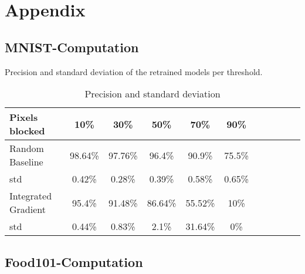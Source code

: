 \documentclass[
		a4paper,
		oneside,
		onecolumn,
		openany,
		parskip=half*,
		table,
		11pt,
		fleqn,
	]{scrbook}
\begin{document}

\begin{titlepage}

\end{titlepage}


\frontmatter



\begin{singlespace}
\tableofcontents
\listoffigures 
\end{singlespace}
	

\mainmatter




\backmatter

\printbibliography

\appendix

\chapter{Appendix}

\section{MNIST-Computation}




Precision and standard deviation of the retrained models per threshold.

\begin{table}[h]
	\centering
	\begin{tabular}{|l|c|c|c|c|c|c|c|c|c|c|}
		\hline
		Pixels blocked & 10\% & 30\% & 50\% & 70\% & 90\% \\
		\hline
		Random Baseline & 98.64\% & 97.76\% & 96.4\% & 90.9\% & 75.5\% \\
		std & 0.42\% & 0.28\% & 0.39\% & 0.58\% & 0.65\%  \\
		\hline
		Integrated Gradient& 95.4\% & 91.48\% & 86.64\% & 55.52\% & 10\%  \\
		std & 0.44\% & 0.83\% & 2.1\% & 31.64\% & 0\%  \\
		\hline
	\end{tabular} \newline
	
	\caption{Precision and standard deviation}
	\label{tab:sclass_precision_ig}
\end{table}


\section{Food101-Computation}
\end{document}
